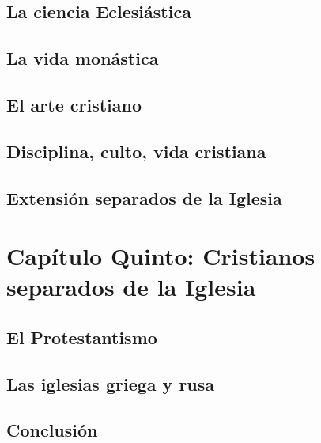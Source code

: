 \raggedbottom{} \documentclass[12pt, a4paper]{book}
\begin{document}
\section{La ciencia Eclesiástica}
\section{La vida monástica}
\section{El arte cristiano}
\section{Disciplina, culto, vida cristiana}
\section{Extensión separados de la Iglesia}
\chapter{Capítulo Quinto: Cristianos separados de la Iglesia}
\section{El Protestantismo}
\section{Las iglesias griega y rusa}
\section{Conclusión}
\end{document}
